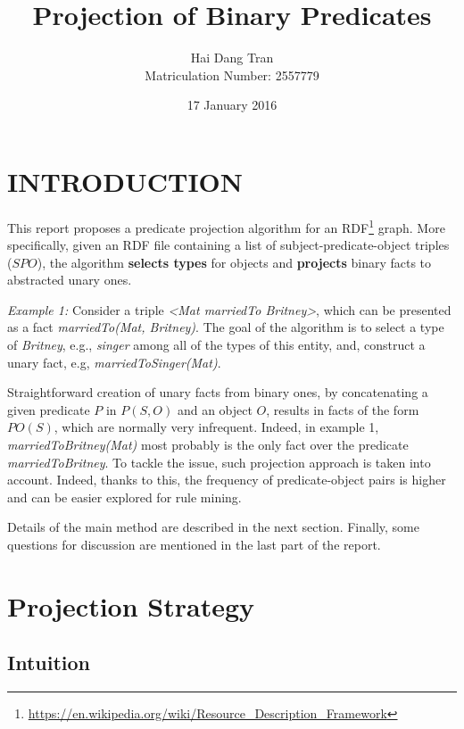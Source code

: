 \documentclass{acm_proc_article-sp}
\begin{document}
\title{Projection of Binary Predicates}
\author{
\alignauthor
Hai Dang Tran\\Matriculation Number: 2557779
}
\date{17 January 2016}

\maketitle

\section{INTRODUCTION}
This report proposes a predicate projection algorithm for an RDF\footnote{\url{https://en.wikipedia.org/wiki/Resource_Description_Framework}} graph. More specifically, given an RDF file containing a list of subject-predicate-object triples ($SPO$), the algorithm \textbf{selects types} for objects and \textbf{projects} binary facts to abstracted unary ones.

\textit{Example 1:} Consider a triple \textit{<Mat marriedTo Britney>}, which can be presented as a fact \textit{marriedTo(Mat, Britney)}. The goal of the algorithm is to select a type of \textit{Britney}, e.g., \textit{singer} among all of the types of this entity, and, construct a unary fact, e.g, \textit{marriedToSinger(Mat)}.


Straightforward creation of unary facts from binary ones, by concatenating a given predicate $P$ in $P(S, O)$ and an object $O$, results in facts of the form $PO(S)$, which are normally very infrequent. Indeed, in example 1, \textit{marriedToBritney(Mat)} most probably is the only fact over the predicate \textit{marriedToBritney}. To tackle the issue, such projection approach is taken into account. Indeed, thanks to this, the frequency of predicate-object pairs is higher and can be easier explored for rule mining.

Details of the main method are described in the next section. Finally, some questions for discussion are mentioned in the last part of the report.

\section{Projection Strategy}

\subsection{Intuition}
\end{document}
